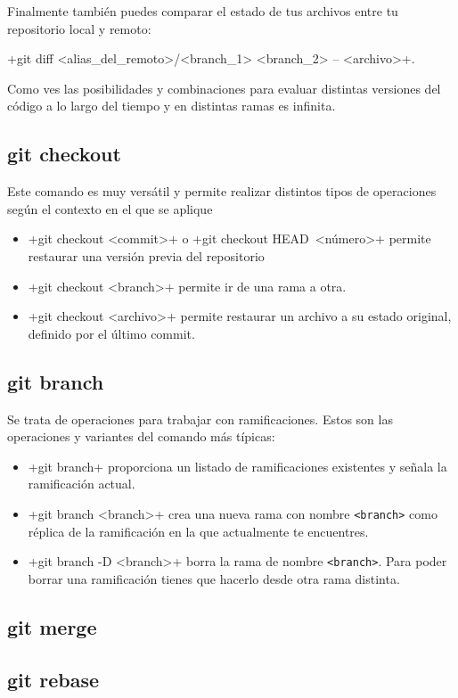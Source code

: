 \documentclass[a5paper,10pt]{article}
\begin{document}
    Finalmente también puedes comparar el estado de tus archivos entre tu repositorio local y remoto:
    
    \cverb+git diff <alias_del_remoto>/<branch_1> <branch_2> -- <archivo>+.
    
    Como ves las posibilidades y combinaciones para evaluar distintas versiones del código a lo largo del tiempo y en distintas ramas es infinita.
    
    \subsection{git checkout}
      Este comando es muy versátil y permite realizar distintos tipos de operaciones según el contexto en el que se aplique
      \begin{itemize}
       \item \cverb+git checkout <commit>+ o \cverb+git checkout HEAD~<número>+ permite restaurar una versión previa del repositorio
       \item \cverb+git checkout <branch>+ permite ir de una rama a otra.
       \item \cverb+git checkout <archivo>+ permite restaurar un archivo a su estado original, definido por el último commit.
      \end{itemize}
      
    \subsection{git branch}
      Se trata de operaciones para trabajar con ramificaciones. Estos son las operaciones y variantes del comando más típicas:
      
      \begin{itemize}
       \item \cverb+git branch+ proporciona un listado de ramificaciones existentes y señala la ramificación actual.
       \item \cverb+git branch <branch>+ crea una nueva rama con nombre \verb+<branch>+ como réplica de la ramificación en la que actualmente te encuentres.
       \item \cverb+git branch -D <branch>+ borra la rama de nombre \verb+<branch>+. Para poder borrar una ramificación tienes que hacerlo desde otra rama distinta.
      \end{itemize}
    
    \subsection{git merge}
    
    \subsection{git rebase}


 
\end{document}
